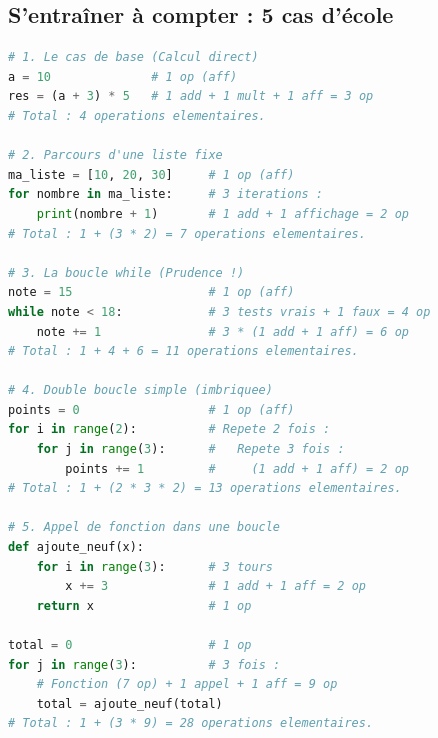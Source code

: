 \newpage

\subsection*{S'entraîner à compter : 5 cas d'école }

\begin{lstlisting}[style=pythonstyle, language=python]
# 1. Le cas de base (Calcul direct)
a = 10              # 1 op (aff)
res = (a + 3) * 5   # 1 add + 1 mult + 1 aff = 3 op
# Total : 4 operations elementaires.

# 2. Parcours d'une liste fixe
ma_liste = [10, 20, 30]     # 1 op (aff)
for nombre in ma_liste:     # 3 iterations :
    print(nombre + 1)       # 1 add + 1 affichage = 2 op
# Total : 1 + (3 * 2) = 7 operations elementaires.

# 3. La boucle while (Prudence !)
note = 15                   # 1 op (aff)
while note < 18:            # 3 tests vrais + 1 faux = 4 op
    note += 1               # 3 * (1 add + 1 aff) = 6 op
# Total : 1 + 4 + 6 = 11 operations elementaires.

# 4. Double boucle simple (imbriquee)
points = 0                  # 1 op (aff)
for i in range(2):          # Repete 2 fois :
    for j in range(3):      #   Repete 3 fois :
        points += 1         #     (1 add + 1 aff) = 2 op
# Total : 1 + (2 * 3 * 2) = 13 operations elementaires.

# 5. Appel de fonction dans une boucle
def ajoute_neuf(x):
    for i in range(3):      # 3 tours
        x += 3              # 1 add + 1 aff = 2 op
    return x                # 1 op

total = 0                   # 1 op
for j in range(3):          # 3 fois :
    # Fonction (7 op) + 1 appel + 1 aff = 9 op
    total = ajoute_neuf(total) 
# Total : 1 + (3 * 9) = 28 operations elementaires.
\end{lstlisting}